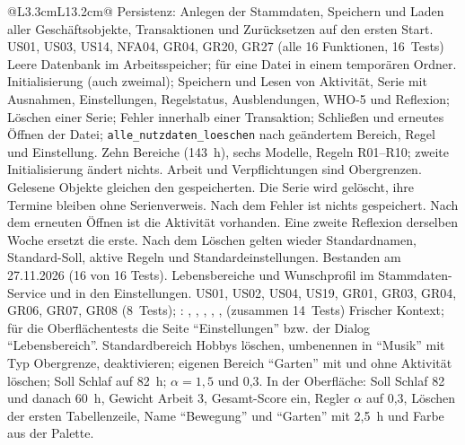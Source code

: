 \begingroup
\begin{longtable}{@{}L{3.3cm}L{13.2cm}@{}}
    {Persistenz: Anlegen der Stammdaten, Speichern und Laden aller Geschäftsobjekte, Transaktionen und Zurücksetzen auf den ersten Start.}
    {US01, US03, US14, NFA04, GR04, GR20, GR27}
    { (alle 16 Funktionen, 16~Tests)}
    {Leere Datenbank im Arbeitsspeicher; für  eine Datei in einem temporären Ordner.}
    {Initialisierung (auch zweimal); Speichern und Lesen von Aktivität, Serie mit Ausnahmen, Einstellungen, Regelstatus, Ausblendungen, WHO-5 und Reflexion; Löschen einer Serie; Fehler innerhalb einer Transaktion; Schließen und erneutes Öffnen der Datei; \texttt{alle\_nutzdaten\_loeschen} nach geändertem Bereich, Regel und Einstellung.}
    {Zehn Bereiche (143~h), sechs Modelle, Regeln R01--R10; zweite Initialisierung ändert nichts. Arbeit und Verpflichtungen sind Obergrenzen. Gelesene Objekte gleichen den gespeicherten. Die Serie wird gelöscht, ihre Termine bleiben ohne Serienverweis. Nach dem Fehler ist nichts gespeichert. Nach dem erneuten Öffnen ist die Aktivität vorhanden. Eine zweite Reflexion derselben Woche ersetzt die erste. Nach dem Löschen gelten wieder Standardnamen, Standard-Soll, aktive Regeln und Standardeinstellungen.}
    {Bestanden am 27.11.2026 (16 von 16 Tests).}
  \midrule
    {Lebensbereiche und Wunschprofil im Stammdaten-Service und in den Einstellungen.}
    {US01, US02, US04, US19, GR01, GR03, GR04, GR06, GR07, GR08}
    { (8~Tests); : , , , , ,  (zusammen 14~Tests)}
    {Frischer Kontext; für die Oberflächentests die Seite \enquote{Einstellungen} bzw. der Dialog \enquote{Lebensbereich}.}
    {Standardbereich Hobbys löschen, umbenennen in \enquote{Musik} mit Typ Obergrenze, deaktivieren; eigenen Bereich \enquote{Garten} mit und ohne Aktivität löschen; Soll Schlaf auf 82~h; $\alpha = 1{,}5$ und 0,3. In der Oberfläche: Soll Schlaf 82 und danach 60~h, Gewicht Arbeit 3, Gesamt-Score ein, Regler $\alpha$ auf 0,3, Löschen der ersten Tabellenzeile, Name \enquote{Bewegung} und \enquote{Garten} mit 2,5~h und Farbe aus der Palette.}

\end{longtable}
